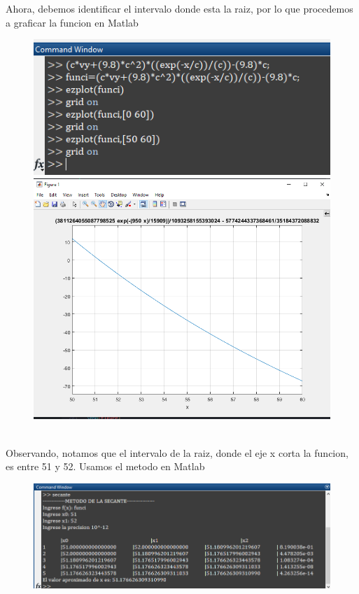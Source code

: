\documentclass{article}
\theoremstyle{mytheoremstyle}
\theoremstyle{mytheoremstyle}
\theoremstyle{myproblemstyle}
\begin{document}
\noindent Ahora, debemos identificar el intervalo donde esta la raiz, por lo que procedemos a graficar la funcion en Matlab
\begin{figure}[ht]
    \includegraphics*[scale=0.7]{img/secante05.png}
    \\ \includegraphics*[scale=0.7]{img/secante06.png}
\end{figure}
\noindent \\ Observando, notamos que el intervalo de la raiz, donde el eje x corta la funcion, es entre 51 y 52. Usamos el metodo en Matlab
\begin{figure}[ht]
    \includegraphics*[scale=0.7]{img/secante07.png}
\end{figure}
\end{document}
